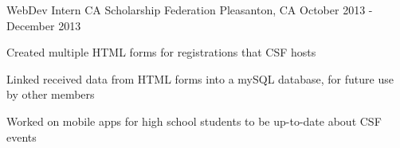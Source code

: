 \begin{cventries}
  \cventry
    {WebDev Intern} %
    {CA Scholarship Federation} %
    {Pleasanton, CA} %
    {October 2013 - December 2013} %
    {
      \begin{cvitems} %
      \item {Created multiple HTML forms for registrations that CSF hosts}
      \item {Linked received data from HTML forms into a mySQL database, for future use by other members}
      \item {Worked on mobile apps for high school students to be up-to-date about CSF events}
      \end{cvitems} 
    }

\end{cventries}
